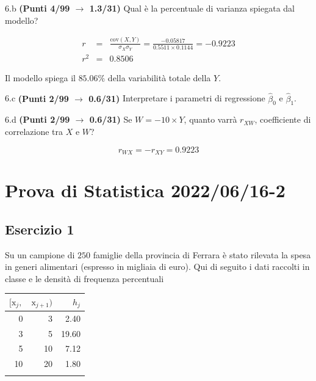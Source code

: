 \documentclass[
  11pt,
]{book}
\theoremstyle{mytheoremstyle}
\theoremstyle{mydefstyle}
\newenvironment{sol}
  {
  \begin{tcolorbox}[enhanced,breakable,arc=0.1mm,boxrule=1pt,colback=white,colframe=iblue,
  title=\bf \fontfamily{lmss}\selectfont \hspace{.5 cm} Soluzione,drop fuzzy shadow]

}{
\end{tcolorbox}
  }
\begin{document}
6.b \textbf{(Punti 4/99 \(\rightarrow\) 1.3/31)} Qual è la percentuale di varianza spiegata dal modello?

\begin{sol}
\begin{eqnarray*}
r&=&\frac{\text{cov}(X,Y)}{\sigma_X\sigma_Y}=\frac{ -0.05817 }{ 0.5511 \times 0.1144 }= -0.9223 \\ 
r^2&=& 0.8506\end{eqnarray*}

Il modello spiega il \(85.06\%\) della variabilità totale della \(Y\).

\end{sol}

6.c \textbf{(Punti 2/99 \(\rightarrow\) 0.6/31)} Interpretare i parametri di regressione \(\hat\beta_0\) e \(\hat\beta_1\).

6.d \textbf{(Punti 2/99 \(\rightarrow\) 0.6/31)} Se \(W=-10\times Y\), quanto varrà \(r_{XW}\), coefficiente di correlazione tra \(X\) e \(W\)?

\begin{sol}
\[r_{WX}=-r_{XY}=0.9223\]

\end{sol}

\section{Prova di Statistica 2022/06/16-2}\label{prova-di-statistica-20220616-2}

\subsection{Esercizio 1}\label{esercizio-1-11}

Su un campione di \(250\) famiglie della provincia di Ferrara è stato rilevata la spesa in generi alimentari (espresso in migliaia di euro). Qui di seguito i dati raccolti in classe e le densità di frequenza percentuali

\begin{table}[H]
\centering
\begin{tabular}{rrr}
\toprule
$[\text{x}_j,$ & $\text{x}_{j+1})$ & $h_j$\\
\midrule
0 & 3 & 2.40\\
3 & 5 & 19.60\\
5 & 10 & 7.12\\
10 & 20 & 1.80\\
 &  & \\
\bottomrule
\end{tabular}
\end{table}
\end{document}
